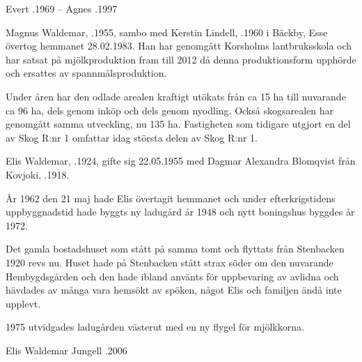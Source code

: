 Evert .1969   --    Agnes .1997





Magnus Waldemar, .1955, sambo med Kerstin Lindell, .1960 i Bäckby, Esse övertog hemmanet 28.02.1983. Han har genomgått Korsholms lantbruksskola och har satsat på mjölkproduktion fram till 2012 då denna produktionsform upphörde och ersattes av spannmålsproduktion.

Under åren har den odlade arealen kraftigt utökats från ca 15 ha till nuvarande ca 96 ha, dels genom inköp och dels genom nyodling. Också skogsarealen har genomgått samma utveckling, nu 135 ha. Fastigheten som tidigare utgjort en del av Skog R:nr 1 omfattar idag största delen av Skog R:nr 1.


Elis Waldemar, .1924, gifte sig 22.05.1955 med Dagmar Alexandra Blomqvist från Kovjoki, .1918.

År 1962 den 21 maj hade Elis övertagit hemmanet och under efterkrigstidens uppbyggnadstid hade byggts ny ladugård år 1948 och nytt boningshus byggdes år 1972.

Det gamla bostadshuset som stått på samma tomt och flyttats från Stenbacken 1920 revs nu. Huset hade på Stenbacken stått strax söder om den nuvarande Hembygdsgården och den hade ibland använts för uppbevaring av avlidna och hävdades av många vara hemsökt av spöken, något Elis och familjen ändå inte upplevt.

1975 utvidgades ladugården västerut med en ny flygel för mjölkkorna.

\begin{jhchildren}
  \item {}
  \item {}
\end{jhchildren}

Elis Waldemar Jungell .2006





